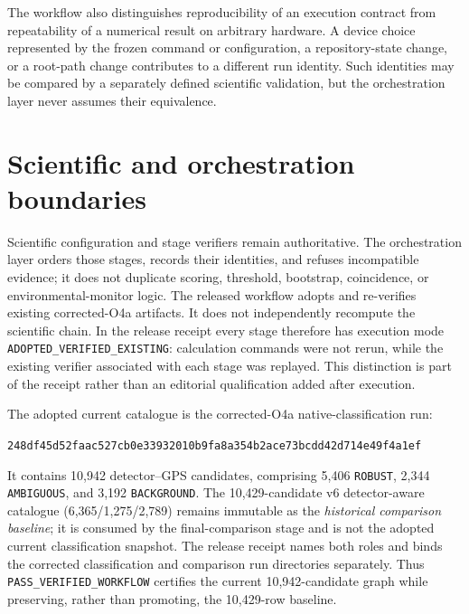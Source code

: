 \documentclass[aps,prd,twocolumn,superscriptaddress,nofootinbib,amsmath,amssymb,floatfix,10pt]{revtex4-2}
\begin{document}
The workflow also distinguishes reproducibility of an execution contract from
repeatability of a numerical result on arbitrary hardware.  A device choice
represented by the frozen command or configuration, a repository-state
change, or a root-path change contributes to a different run identity.  Such
identities may be compared by a separately defined scientific validation, but
the orchestration layer never assumes their equivalence.

\section{Scientific and orchestration boundaries}
\label{sec:boundaries}

Scientific configuration and stage verifiers remain authoritative.  The
orchestration layer orders those stages, records their identities, and refuses
incompatible evidence; it does not duplicate scoring, threshold, bootstrap,
coincidence, or environmental-monitor logic.  The released workflow adopts and
re-verifies existing corrected-O4a artifacts.  It does not independently
recompute the scientific chain.  In the release receipt every stage therefore
has execution mode \texttt{ADOPTED\_VERIFIED\_EXISTING}: calculation commands
were not rerun, while the existing verifier associated with each stage was
replayed.  This distinction is part of the receipt rather than an editorial
qualification added after execution.

\noindent\begin{minipage}{\columnwidth}
The adopted current catalogue is the corrected-O4a native-classification run:
\par\smallskip
{\raggedright\noindent\footnotesize
\nolinkurl{248df45d52faac527cb0e33932010b9fa8a354b2ace73bcdd42d714e49f4a1ef}\par}
\smallskip
It contains 10,942 detector--GPS candidates, comprising 5,406
\texttt{ROBUST}, 2,344
\texttt{AMBIGUOUS}, and 3,192 \texttt{BACKGROUND}.  The 10,429-candidate v6
detector-aware catalogue (6,365/1,275/2,789) remains immutable as the
\emph{historical comparison baseline}; it is consumed by the final-comparison
stage and is not the adopted current classification snapshot.  The release
receipt names both roles and binds the corrected classification and comparison
run directories separately.  Thus \texttt{PASS\_VERIFIED\_WORKFLOW} certifies
the current 10,942-candidate graph while preserving, rather than promoting, the
10,429-row baseline.
\end{minipage}
\end{document}
